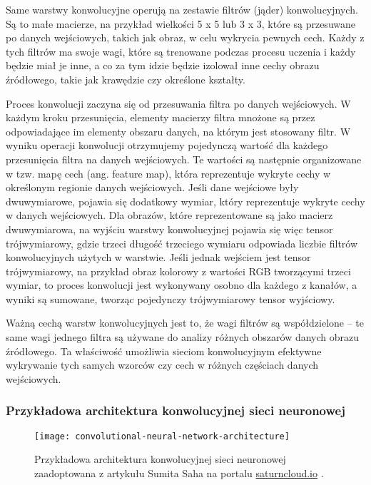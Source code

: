 Same warstwy konwolucyjne operują na zestawie filtrów (jąder) konwolucyjnych.
Są to małe macierze, na przykład wielkości 5 x 5 lub 3 x 3, które są przesuwane po danych wejściowych, takich jak obraz, w celu wykrycia pewnych cech.
Każdy z tych filtrów ma swoje wagi, które są trenowane podczas procesu uczenia i każdy będzie miał je inne, a co za tym idzie będzie izolował inne cechy obrazu źródłowego, takie jak krawędzie czy określone kształty.

Proces konwolucji zaczyna się od przesuwania filtra po danych wejściowych.
W każdym kroku przesunięcia, elementy macierzy filtra mnożone są przez odpowiadające im elementy obszaru danych, na którym jest stosowany filtr.
W wyniku operacji konwolucji otrzymujemy pojedynczą wartość dla każdego przesunięcia filtra na danych wejściowych.
Te wartości są następnie organizowane w tzw. mapę cech (ang. feature map), która reprezentuje wykryte cechy w określonym regionie danych wejściowych.
Jeśli dane wejściowe były dwuwymiarowe, pojawia się dodatkowy wymiar, który reprezentuje wykryte cechy w danych wejściowych.
Dla obrazów, które reprezentowane są jako macierz dwuwymiarowa, na wyjściu warstwy konwolucyjnej pojawia się więc tensor trójwymiarowy, gdzie trzeci długość trzeciego wymiaru odpowiada liczbie filtrów konwolucyjnych użytych w warstwie.
Jeśli jednak wejściem jest tensor trójwymiarowy, na przykład obraz kolorowy z wartości RGB tworzącymi trzeci wymiar, to proces konwolucji jest wykonywany osobno dla każdego z kanałów, a wyniki są sumowane, tworząc pojedynczy trójwymiarowy tensor wyjściowy.

Ważną cechą warstw konwolucyjnych jest to, że wagi filtrów są współdzielone -- te same wagi jednego filtra są używane do analizy różnych obszarów danych obrazu źródłowego.
Ta właściwość umożliwia sieciom konwolucyjnym efektywne wykrywanie tych samych wzorców czy cech w różnych częściach danych wejściowych.

\subsubsection{Przykładowa architektura konwolucyjnej sieci neuronowej}

\begin{figure}[ht]
  \texttt{[image: convolutional-neural-network-architecture]}
  \caption[Przykładowa architektura konwolucyjnej sieci neuronowej]{Przykładowa architektura konwolucyjnej sieci neuronowej zaadoptowana z artykułu Sumita Saha na portalu \url{saturncloud.io} \cite{saha2018comprehensive}.}
  \label{fig:convolutional-neural-network-architecture}
\end{figure}

